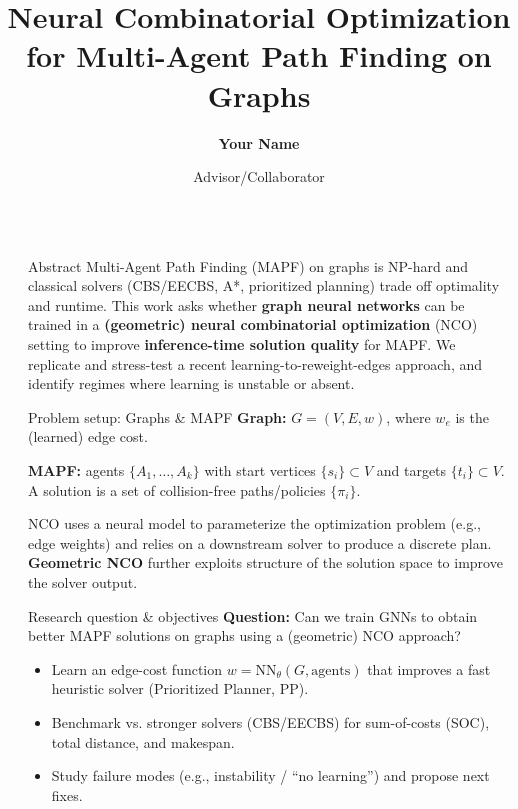 \documentclass[final]{beamer}
\title{Neural Combinatorial Optimization for Multi-Agent Path Finding on Graphs}
\author{\textbf{Your Name} \inst{1} \and Advisor/Collaborator \inst{1}}
\institute[shortinst]{\inst{1} Your Institute / Lab}
\newlength{\sepwidth}
\newlength{\colwidth}
\newcommand{\separatorcolumn}{\begin{column}{\sepwidth}\end{column}}
\begin{document}
\begin{frame}[t]
\begin{columns}[t]
\separatorcolumn

\begin{column}{\colwidth}

  \begin{block}{Abstract}
    Multi-Agent Path Finding (MAPF) on graphs is NP-hard and classical solvers (CBS/EECBS, A*, prioritized planning) trade off optimality and runtime.
    This work asks whether \textbf{graph neural networks} can be trained in a \textbf{(geometric) neural combinatorial optimization} (NCO) setting to improve \textbf{inference-time solution quality} for MAPF.
    We replicate and stress-test a recent learning-to-reweight-edges approach, and identify regimes where learning is unstable or absent.
  \end{block}

  \begin{block}{Problem setup: Graphs \& MAPF}
    \textbf{Graph:} $G=(V,E,w)$, where $w_e$ is the (learned) edge cost.

    \textbf{MAPF:} agents $\{A_1,\dots,A_k\}$ with start vertices $\{s_i\}\subset V$ and targets $\{t_i\}\subset V$.
    A solution is a set of collision-free paths/policies $\{\pi_i\}$.

    NCO uses a neural model to parameterize the optimization problem (e.g., edge weights) and relies on a downstream solver to produce a discrete plan.
    \textbf{Geometric NCO} further exploits structure of the solution space to improve the solver output.
  \end{block}

  \begin{alertblock}{Research question \& objectives}
    \textbf{Question:} Can we train GNNs to obtain better MAPF solutions on graphs using a (geometric) NCO approach?

    \vspace{0.4em}
    \begin{itemize}
      \item Learn an edge-cost function $w=\mathrm{NN}_\theta(G,\text{agents})$ that improves a fast heuristic solver (Prioritized Planner, PP).
      \item Benchmark vs. stronger solvers (CBS/EECBS) for sum-of-costs (SOC), total distance, and makespan.
      \item Study failure modes (e.g., instability / ``no learning'') and propose next fixes.
    \end{itemize}
  \end{alertblock}


\end{column}
\end{columns}
\end{frame}
\end{document}
